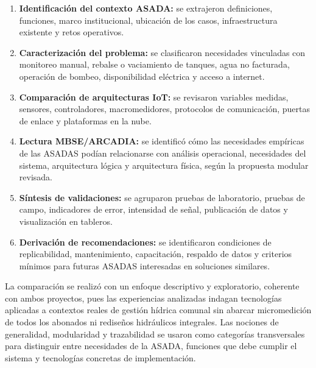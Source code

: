 \documentclass[12pt,letterpaper]{article}
\begin{document}
\begin{enumerate}
  \item \textbf{Identificación del contexto ASADA:} se extrajeron definiciones, funciones, marco institucional, ubicación de los casos, infraestructura existente y retos operativos.
  \item \textbf{Caracterización del problema:} se clasificaron necesidades vinculadas con monitoreo manual, rebalse o vaciamiento de tanques, agua no facturada, operación de bombeo, disponibilidad eléctrica y acceso a internet.
  \item \textbf{Comparación de arquitecturas IoT:} se revisaron variables medidas, sensores, controladores, macromedidores, protocolos de comunicación, puertas de enlace y plataformas en la nube.
  \item \textbf{Lectura MBSE/ARCADIA:} se identificó cómo las necesidades empíricas de las ASADAS podían relacionarse con análisis operacional, necesidades del sistema, arquitectura lógica y arquitectura física, según la propuesta modular revisada.
  \item \textbf{Síntesis de validaciones:} se agruparon pruebas de laboratorio, pruebas de campo, indicadores de error, intensidad de señal, publicación de datos y visualización en tableros.
  \item \textbf{Derivación de recomendaciones:} se identificaron condiciones de replicabilidad, mantenimiento, capacitación, respaldo de datos y criterios mínimos para futuras ASADAS interesadas en soluciones similares.
\end{enumerate}

La comparación se realizó con un enfoque descriptivo y exploratorio, coherente con ambos proyectos, pues las experiencias analizadas indagan tecnologías aplicadas a contextos reales de gestión hídrica comunal sin abarcar micromedición de todos los abonados ni rediseños hidráulicos integrales. Las nociones de generalidad, modularidad y trazabilidad se usaron como categorías transversales para distinguir entre necesidades de la ASADA, funciones que debe cumplir el sistema y tecnologías concretas de implementación.
\end{document}
